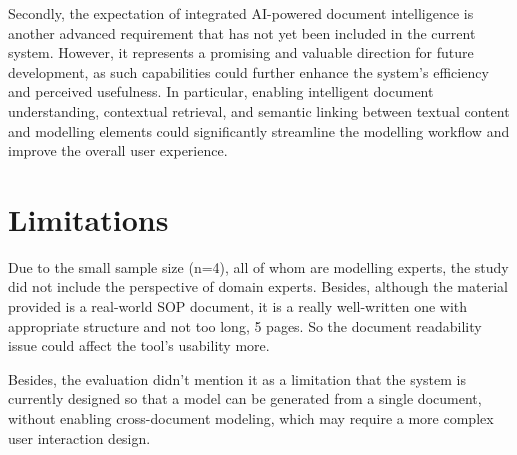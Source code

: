 Secondly, the expectation of integrated AI-powered document intelligence is another advanced requirement that has not yet been included in the current system. However, it represents a promising and valuable direction for future development, as such capabilities could further enhance the system’s efficiency and perceived usefulness. In particular, enabling intelligent document understanding, contextual retrieval, and semantic linking between textual content and modelling elements could significantly streamline the modelling workflow and improve the overall user experience.

\section {Limitations}
Due to the small sample size (n=4), all of whom are modelling experts, the study did not include the perspective of domain experts. Besides, although the material provided is a real-world SOP document, it is a really well-written one with appropriate structure and not too long, 5 pages. So the document readability issue could affect the tool's usability more.

Besides, the evaluation didn't mention it as a limitation that the system is currently designed so that a model can be generated from a single document, without enabling cross-document modeling, which may require a more complex user interaction design.





